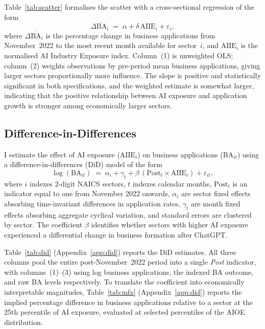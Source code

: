\documentclass[12pt]{article}
\begin{document}
Table~\ref{tab:scatter} formalises the scatter with a cross-sectional
regression of the form
\begin{equation}
  \Delta\overline{\text{BA}}_{i} \;=\; \alpha + \delta\,\text{AIIE}_i + \varepsilon_i,
  \label{eq:scatter}
\end{equation}
where $\Delta\overline{\text{BA}}_{i}$ is the percentage change in business applications
from November~2022 to the most recent month available for sector~$i$, and $\text{AIIE}_i$
is the normalised AI Industry Exposure index.
Column~(1) is unweighted OLS; column~(2) weights observations by
pre-period mean business applications, giving larger sectors proportionally
more influence.
The slope is positive and statistically significant in both specifications,
and the weighted estimate is somewhat larger, indicating that the positive
relationship between AI exposure and application growth is stronger
among economically larger sectors.

\subsection{Difference-in-Differences}
\label{sec:results_did}


I estimate the effect of AI exposure ($\text{AIIE}_{i}$) on business applications ($\text{BA}_{it}$) using a difference-in-differences (DiD) model of the form
\begin{equation}
  \log(\text{BA}_{it}) \;=\; \alpha_i + \gamma_t
    + \beta\,(\text{Post}_t \times \text{AIIE}_i) + \varepsilon_{it},
  \label{eq:did}
\end{equation}
where $i$ indexes 2-digit NAICS sectors, $t$ indexes calendar months,
$\text{Post}_t$ is an indicator equal to one from November 2022 onwards,
$\alpha_i$ are sector fixed effects absorbing time-invariant differences in
application rates, $\gamma_t$ are month fixed effects absorbing aggregate
cyclical variation, and standard errors are clustered by sector.
The coefficient $\beta$ identifies whether sectors with higher AI exposure
experienced a differential change in business formation after ChatGPT.


Table~\ref{tab:did} (Appendix~\ref{app:did}) reports the DiD estimates.
All three columns pool the entire post-November~2022 period into a single
\textit{Post} indicator, with columns~(1)--(3) using log business applications,
the indexed BA outcome, and raw BA levels respectively.
To translate the coefficient into economically interpretable magnitudes,
Table~\ref{tab:mfx} (Appendix~\ref{app:did}) reports the implied percentage difference in business
applications relative to a sector at the 25th percentile of AI exposure,
evaluated at selected percentiles of the AIOE distribution.
\end{document}
